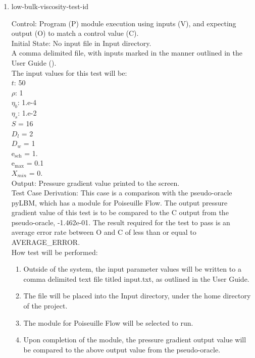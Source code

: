 \documentclass[12pt, titlepage]{article}
\newcounter{testcounter} %
\begin{document}
\begin{enumerate}
\item{low-bulk-viscosity-test-id\thetestcounter \\}

Control: Program (P) module execution using inputs (V), and expecting output (O) to match a control value (C).\\
					
Initial State: No input file in Input directory.\\
					
A comma delimited file, with inputs marked in the manner outlined in the User Guide (\citet{LBM_UserGuide_PM}).\\The input values for this test will be:\\
$t$: 50\\
$\rho$: 1\\
$\eta_b$: 1.e-4\\
$\eta_s$: 1.e-2\\
$S$ = 16\\
$D_{l}$ = 2\\
$D_{w}$ = 1\\
$\mathrm{e_{sch}}$ = 1.\\
$\mathrm{e_{max}}$ = 0.1\\
$X_{min}$ = 0.\\

					
Output: Pressure gradient value printed to the screen. \\ 

Test Case Derivation: This case is a comparison with the pseudo-oracle pyLBM, which has a module for Poiseuille Flow. The output pressure gradient value of this test is to be compared to the C output from the pseudo-oracle, -1.462e-01. The result required for the test to pass is an average error rate between O and C of less than or equal to AVERAGE\_ERROR.\\

					
How test will be performed: 

\begin{enumerate}
\item Outside of the system, the input parameter values will be written to a comma delimited text file titled input.txt, as outlined in the User Guide.
\item The file will be placed into the Input directory, under the home directory of the project.
\item The module for Poiseuille Flow will be selected to run.
\item Upon completion of the module, the pressure gradient output value will be compared to the above output value from the pseudo-oracle.
\end{enumerate}	


\end{enumerate}
\end{document}
